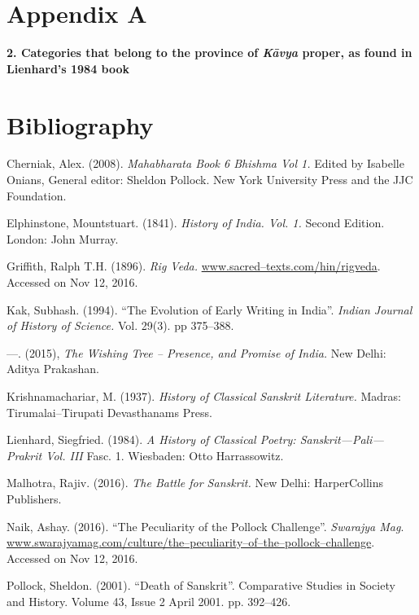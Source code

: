\section*{Appendix A}

\textbf{2. Categories that belong to the province of \textit{Kāvya} proper, as found in Lienhard’s 1984 book}


\section*{Bibliography}

\begin{thebibliography}{99}
 Cherniak, Alex. (2008). \textit{Mahabharata Book 6 Bhishma Vol 1.} Edited by Isabelle Onians, General editor: Sheldon Pollock. New York University Press and the JJC Foundation.

  Elphinstone, Mountstuart. (1841). \textit{History of India. Vol. 1.} Second Edition. London: John Murray.

  Griffith, Ralph T.H. (1896). \textit{Rig Veda.} \url{www.sacred–texts.com/hin/rigveda}. Accessed on Nov 12, 2016.

  Kak, Subhash. (1994). “The Evolution of Early Writing in India”. \textit{Indian Journal of History of Science.} Vol. 29(3). pp 375–388.

  —. (2015), \textit{The Wishing Tree – Presence, and Promise of India.} New Delhi: Aditya Prakashan.

  Krishnamachariar, M. (1937). \textit{History of Classical Sanskrit Literature.} Madras: Tirumalai–Tirupati Devasthanams Press.

  Lienhard, Siegfried. (1984). \textit{A History of Classical Poetry: Sanskrit—Pali—Prakrit Vol. III} Fasc. 1. Wiesbaden: Otto Harrassowitz.

  Malhotra, Rajiv. (2016). \textit{The Battle for Sanskrit.} New Delhi: HarperCollins Publishers.

  Naik, Ashay. (2016). “The Peculiarity of the Pollock Challenge”. \textit{Swarajya Mag}. \url{www.swarajyamag.com/culture/the–peculiarity–of–the–pollock–challenge}. Accessed on Nov 12, 2016.

  Pollock, Sheldon. (2001). “Death of Sanskrit”. Comparative Studies in Society and History. Volume 43, Issue 2 April 2001. pp. 392–426. 


\end{thebibliography}
